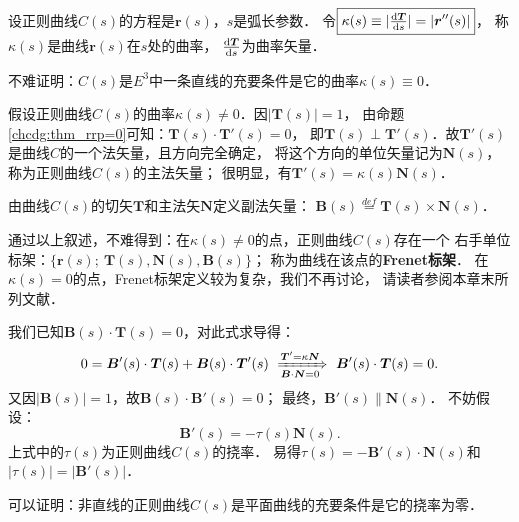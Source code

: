     设正则曲线$C(s)$的方程是$\boldsymbol{r}(s)$，$s$是弧长参数．
    令$\boxed{\kappa(s) \equiv |\tfrac{{\rm d} \boldsymbol{T}}{{\rm d}s}|=|\boldsymbol{r}''(s)|}$，
    称$\kappa(s)$是曲线$\boldsymbol{r}(s)$在$s$处的{\heiti 曲率}，
    $\frac{{\rm d} \boldsymbol{T}}{{\rm d}s}$为{\heiti 曲率矢量}．

不难证明：$C(s)$是$E^3$中一条直线的充要条件是它的曲率$\kappa(s)\equiv 0$．


假设正则曲线$C(s)$的曲率$\kappa(s)\neq 0$．因$|\boldsymbol{T}(s)|=1$，
由命题\ref{chcdg:thm_rrp=0}可知：$\boldsymbol{T}(s)\cdot \boldsymbol{T}'(s)=0$，
即$\boldsymbol{T}(s) \perp \boldsymbol{T}'(s)$．故$\boldsymbol{T}'(s)$是曲线$C$的一个法矢量，且方向完全确定，
将这个方向的单位矢量记为$\boldsymbol{N}(s)$，称为正则曲线$C(s)$的{\heiti 主法矢量}；
很明显，有$\boxed{\boldsymbol{T}'(s) = \kappa(s) \boldsymbol{N}(s) }$．

由曲线$C(s)$的切矢$\boldsymbol{T}$和主法矢$\boldsymbol{N}$定义{\heiti 副法矢量}：
$    \boldsymbol{B}(s) \overset{def}{=} \boldsymbol{T}(s) \times \boldsymbol{N}(s)$．

通过以上叙述，不难得到：在$\kappa(s)\neq 0$的点，正则曲线$C(s)$存在一个
右手单位标架：$\{\boldsymbol{r}(s);\  \boldsymbol{T}(s), \boldsymbol{N}(s), \boldsymbol{B}(s) \}$；
称为曲线在该点的{\bfseries \heiti Frenet标架}．
在$\kappa(s)= 0$的点，Frenet标架定义较为复杂，我们不再讨论，
请读者参阅本章末所列文献．


我们已知$\boldsymbol{B}(s)\cdot \boldsymbol{T}(s) = 0$，对此式求导得：
\begin{align}
    0= \boldsymbol{B}'(s) \cdot \boldsymbol{T}(s) + \boldsymbol{B}(s) \cdot \boldsymbol{T}'(s)
    \ \xRightarrow [\boldsymbol{B} \cdot \boldsymbol{N}=0]{\boldsymbol{T}' = \kappa \boldsymbol{N}} \ 
    \boldsymbol{B}'(s) \cdot \boldsymbol{T}(s) =0 .
\end{align}
又因$|\boldsymbol{B}(s)|=1$，故$\boldsymbol{B}(s) \cdot \boldsymbol{B}'(s)=0$；
最终，$\boldsymbol{B}'(s) \parallel \boldsymbol{N}(s)$．
不妨假设：
\begin{equation}
    \boldsymbol{B}'(s)=-\tau(s) \boldsymbol{N}(s) .
\end{equation}
上式中的$\tau(s)$为正则曲线$C(s)$的{\heiti 挠率}．
易得$\tau(s)= - \boldsymbol{B}'(s) \cdot \boldsymbol{N}(s)$和$|\tau(s)|=|\boldsymbol{B}'(s)|$．

可以证明：非直线的正则曲线$C(s)$是平面曲线的充要条件是它的挠率为零．


